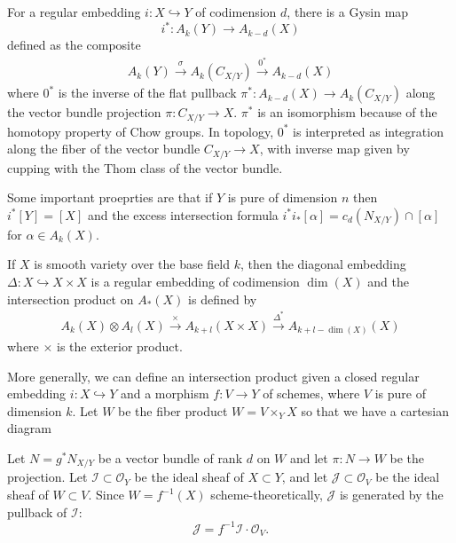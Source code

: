 \documentclass[12pt]{article}
\begin{document}
\begin{example}
    For a regular embedding $i:X\hookrightarrow Y$ of codimension $d$, there is a Gysin map \[i^*:A_k(Y)\to A_{k-d}(X)\] defined as the composite \begin{align*}
        A_k(Y)\xrightarrow{\sigma} A_k(C_{X/Y})\xrightarrow{0^*} A_{k-d}(X)
    \end{align*} where $0^*$ is the inverse of the flat pullback $\pi^*:A_{k-d}(X)\to A_k(C_{X/Y})$ along the vector bundle projection $\pi:C_{X/Y}\to X$. $\pi^*$ is an isomorphism because of the homotopy property of Chow groups. In topology, $0^*$ is interpreted as integration along the fiber of the vector bundle $C_{X/Y}\to X$, with inverse map given by cupping with the Thom class of the vector bundle. 

    Some important proeprties are that if $Y$ is pure of dimension $n$ then $i^*[Y]=[X]$ and the excess intersection formula $i^*i_*[\alpha] = c_d(N_{X/Y})\cap [\alpha]$ for $\alpha\in A_k(X)$.

    If $X$ is smooth variety over the base field $k$, then the diagonal embedding $\Delta:X\hookrightarrow X\times X$ is a regular embedding of codimension $\dim(X)$ and the intersection product on $A_*(X)$ is defined by \begin{align*}
        A_k(X)\otimes A_l(X)\xrightarrow{\times} A_{k+l}(X\times X)\xrightarrow{\Delta^*} A_{k+l-\dim(X)}(X)
    \end{align*} where $\times$ is the exterior product.
\end{example}
More generally, we can define an intersection product given a closed regular embedding $i:X\hookrightarrow Y$ and a morphism $f:V\to Y$ of schemes, where $V$ is pure of dimension $k$. Let $W$ be the fiber product $W=V\times_Y X$ so that we have a cartesian diagram \begin{center}
\end{center}
Let $N = g^*N_{X/Y}$ be a vector bundle of rank $d$ on $W$ and let $\pi:N\to W$ be the projection. 
Let $\mathcal I\subset \mathcal O_Y$
be the ideal sheaf of \(X\subset Y\), and let $\mathcal J\subset \mathcal O_V$
be the ideal sheaf of \(W\subset V\). Since \(W=f^{-1}(X)\) scheme-theoretically,
\(\mathcal J\) is generated by the pullback of \(\mathcal I\):
\[
    \mathcal J=f^{-1}\mathcal I\cdot \mathcal O_V.
\]
\end{document}
